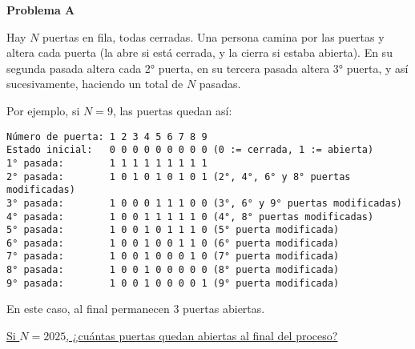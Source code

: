 \begin{center}
\Large \textbf{Problema A} \\
\end{center}

Hay $N$ puertas en fila, todas cerradas. Una persona camina por las puertas y altera cada puerta (la abre si está cerrada, y la cierra si estaba abierta).
En su segunda pasada altera cada 2° puerta, en su tercera pasada altera 3° puerta, y así sucesivamente, haciendo un total de $N$ pasadas.

\bigskip

Por ejemplo, si $N = 9$, las puertas quedan así:

\bigskip

\begin{verbatim}
Número de puerta: 1 2 3 4 5 6 7 8 9
Estado inicial:   0 0 0 0 0 0 0 0 0 (0 := cerrada, 1 := abierta)
1° pasada:        1 1 1 1 1 1 1 1 1 
2° pasada:        1 0 1 0 1 0 1 0 1 (2°, 4°, 6° y 8° puertas modificadas)
3° pasada:        1 0 0 0 1 1 1 0 0 (3°, 6° y 9° puertas modificadas)
4° pasada:        1 0 0 1 1 1 1 1 0 (4°, 8° puertas modificadas)
5° pasada:        1 0 0 1 0 1 1 1 0 (5° puerta modificada)
6° pasada:        1 0 0 1 0 0 1 1 0 (6° puerta modificada)
7° pasada:        1 0 0 1 0 0 0 1 0 (7° puerta modificada)
8° pasada:        1 0 0 1 0 0 0 0 0 (8° puerta modificada)
9° pasada:        1 0 0 1 0 0 0 0 1 (9° puerta modificada)
\end{verbatim}

\bigskip

En este caso, al final permanecen 3 puertas abiertas.

\bigskip

\underline{Si $N = 2025$, ¿cuántas puertas quedan abiertas al final del proceso?}

